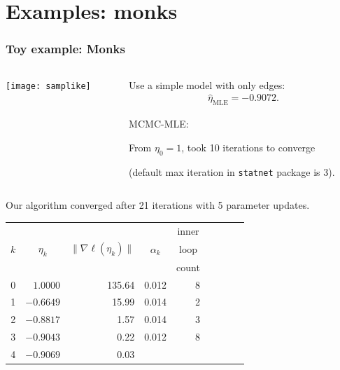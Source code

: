 \documentclass[ 10pt]{beamer}
\newcommand{\etaMLE}{\hat{\eta}_{\textrm{MLE}}}
\begin{document}
\section{Examples: monks}
\frame
{
  \frametitle{Toy example: Monks}  

\begin{columns}[t]
\begin{column}[T]{0.3\textwidth}
\texttt{[image: samplike]}
\end{column}

\begin{column}[r]{0.7\textwidth}
Use a simple model with only edges:
\begin{align*}
	\etaMLE = -0.9072.
\end{align*}

\pause
MCMC-MLE: %

From $\eta_0 = 1$, took 10 iterations to converge 

(default max iteration in \texttt{statnet} package is 3).
\end{column}
\end{columns}

\pause
Our algorithm converged after 21 iterations with 5 parameter updates.
{\footnotesize
\begin{table}
\begin{center}
\begin{tabular}{rrrrrrlrr}
  \hline
    &  &  &  & \multicolumn{1}{c}{inner}\\
  \multicolumn{1}{c}{$k$} & 
  \multicolumn{1}{c}{$\eta_k$} &
  \multicolumn{1}{c}{$\lVert \nabla \ell(\eta_k) \rVert$} &
  \multicolumn{1}{c}{$\alpha_k$} &
  \multicolumn{1}{c}{loop }\\
    &  &  &  & \multicolumn{1}{c}{count}\\
  \hline
   0 &  $1.0000$ & 135.64 &  0.012 & 8\\
   1 & $-0.6649$ & 15.99  &  0.014 & 2 \\
   2 & $-0.8817$ & 1.57   &  0.014 & 3 \\
   3 & $-0.9043$ & 0.22   &  0.012 & 8 \\
   4 & $-0.9069$ & 0.03   &  &  \\
   \hline
\end{tabular} \label{T:Sampson redo}
\end{center}
\end{table}}
}
\end{document}
